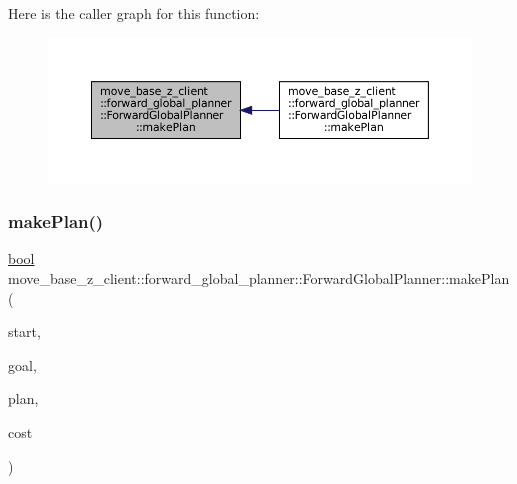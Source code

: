 Here is the caller graph for this function\+:
\nopagebreak
\begin{figure}[H]
\begin{center}
\leavevmode
\includegraphics[width=350pt]{classmove__base__z__client_1_1forward__global__planner_1_1ForwardGlobalPlanner_a2dcf9aad74efaaa92ee78650f7a23096_icgraph}
\end{center}
\end{figure}
\mbox{\label{classmove__base__z__client_1_1forward__global__planner_1_1ForwardGlobalPlanner_a16f21fc4735c26535517678d29a6f1f3}} 
\subsubsection{\texorpdfstring{make\+Plan()}{makePlan()}\hspace{0.1cm}{\footnotesize\ttfamily [2/2]}}
{\footnotesize\ttfamily \hyperlink{classbool}{bool} move\+\_\+base\+\_\+z\+\_\+client\+::forward\+\_\+global\+\_\+planner\+::\+Forward\+Global\+Planner\+::make\+Plan (\begin{DoxyParamCaption}\item[{const geometry\+\_\+msgs\+::\+Pose\+Stamped \&}]{start,  }\item[{const geometry\+\_\+msgs\+::\+Pose\+Stamped \&}]{goal,  }\item[{std\+::vector$<$ geometry\+\_\+msgs\+::\+Pose\+Stamped $>$ \&}]{plan,  }\item[{double \&}]{cost }\end{DoxyParamCaption})}




